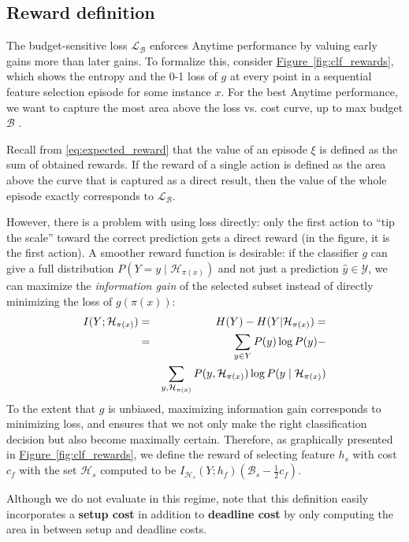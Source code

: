 \subsection{Reward definition}\label{sec:clf_reward}



The budget-sensitive loss $\mathcal{L}_\mathcal{B}$ enforces Anytime performance by valuing early gains more than later gains.
To formalize this, consider \hyperref[fig:clf_rewards]{Figure~\ref*{fig:clf_rewards}}, which shows the entropy and the 0-1 loss of $g$ at every point in a sequential feature selection episode for some instance $x$.
For the best Anytime performance, we want to capture the most area above the loss vs. cost curve, up to max budget $\mathcal{B}$ \parencite{Karayev-NIPS-2012}.

Recall from \eqref{eq:expected_reward} that the value of an episode $\xi$ is defined as the sum of obtained rewards.
If the reward of a single action is defined as the area above the curve that is captured as a direct result, then the value of the whole episode exactly corresponds to $\mathcal{L}_\mathcal{B}$.

However, there is a problem with using loss directly: only the first action to ``tip the scale'' toward the correct prediction gets a direct reward (in the figure, it is the first action).  A smoother reward function is desirable:
if the classifier $g$ can give a full distribution $P(Y = y \mid \mathcal{H}_{\pi(x)})$ and not just a prediction $\hat{y} \in \mathcal{Y}$, we can maximize the \emph{information gain} of the selected subset instead of directly minimizing the loss of $g(\pi(x))$:
\begin{eqnarray}
I(Y; \mathcal{H}_{\pi(x)}) &=& H(Y) - H(Y | \mathcal{H}_{\pi(x)}) = \\ \notag
&=& \sum_{y \in Y} P(y) \log P(y) -  \\ \notag
&&\sum_{y, \mathcal{H}_{\pi(x)}} P(y, \mathcal{H}_{\pi(x)}) \log P(y \mid \mathcal{H}_{\pi(x)})
\end{eqnarray}
To the extent that $g$ is unbiased, maximizing information gain corresponds to minimizing loss, and ensures that we not only make the right classification decision but also become maximally certain.
Therefore, as graphically presented in \hyperref[fig:clf_rewards]{Figure~\ref*{fig:clf_rewards}}, we define the reward of selecting feature $h_s$ with cost $c_f$ with the set $\mathcal{H}_s$ computed to be $I_{\mathcal{H}_s}(Y; h_f) (\mathcal{B}_s - \frac{1}{2}c_f)$.


Although we do not evaluate in this regime, note that this definition easily incorporates a \textbf{setup cost} in addition to \textbf{deadline cost} by only computing the area in between setup and deadline costs.
